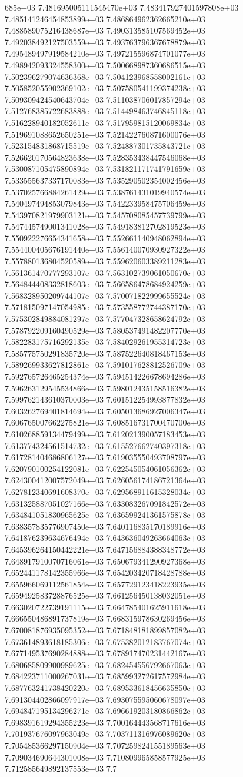 685e+03	7.481695005111545470e+03	7.483417927401597808e+03	7.485141246454853899e+03	7.486864962362665210e+03	7.488589075216438687e+03	7.490313585107569452e+03	7.492038492127503559e+03	7.493763796367678879e+03	7.495489497919584210e+03	7.497215596874701077e+03	7.498942093324558300e+03	7.500668987360686515e+03	7.502396279074636368e+03	7.504123968558002161e+03	7.505852055902369102e+03	7.507580541199374238e+03	7.509309424540643704e+03	7.511038706017857294e+03	7.512768385722683888e+03	7.514498463746845118e+03	7.516228940182052611e+03	7.517959815120069834e+03	7.519691088652650251e+03	7.521422760871600076e+03	7.523154831868715519e+03	7.524887301735843721e+03	7.526620170564823638e+03	7.528353438447546068e+03	7.530087105475890894e+03	7.531821171741791659e+03	7.533555637337170083e+03	7.535290502354002456e+03	7.537025766884261429e+03	7.538761431019940574e+03	7.540497494853079843e+03	7.542233958475706459e+03	7.543970821979903121e+03	7.545708085457739799e+03	7.547445749001341028e+03	7.549183812702819523e+03	7.550922276654341658e+03	7.552661140948062894e+03	7.554400405676191440e+03	7.556140070930927322e+03	7.557880136804520589e+03	7.559620603389211283e+03	7.561361470777293107e+03	7.563102739061050670e+03	7.564844408332818603e+03	7.566586478684924259e+03	7.568328950209744107e+03	7.570071822999655524e+03	7.571815097147054985e+03	7.573558772744387170e+03	7.575302849884081297e+03	7.577047328658624792e+03	7.578792209160490529e+03	7.580537491482207770e+03	7.582283175716292135e+03	7.584029261955314723e+03	7.585775750291835720e+03	7.587522640818467153e+03	7.589269933627812861e+03	7.591017628812526709e+03	7.592765726465254374e+03	7.594514226678694286e+03	7.596263129545534866e+03	7.598012435158516382e+03	7.599762143610370003e+03	7.601512254993877832e+03	7.603262769401814694e+03	7.605013686927006347e+03	7.606765007662275821e+03	7.608516731700470700e+03	7.610268859134479499e+03	7.612021390057183453e+03	7.613774324561514732e+03	7.615527662740397318e+03	7.617281404686806127e+03	7.619035550493708797e+03	7.620790100254122081e+03	7.622545054061056362e+03	7.624300412007572049e+03	7.626056174186721364e+03	7.627812340691608370e+03	7.629568911615328034e+03	7.631325887051027166e+03	7.633083267091842572e+03	7.634841051830965625e+03	7.636599241361575878e+03	7.638357835776907450e+03	7.640116835170189916e+03	7.641876239634676494e+03	7.643636049263664063e+03	7.645396264150442221e+03	7.647156884388348772e+03	7.648917910070716061e+03	7.650679341290927368e+03	7.652441178142355966e+03	7.654203420718428788e+03	7.655966069112561854e+03	7.657729123418223935e+03	7.659492583728876525e+03	7.661256450138032051e+03	7.663020722739191115e+03	7.664785401625911618e+03	7.666550486891737819e+03	7.668315978630269456e+03	7.670081876935095352e+03	7.671848181899857082e+03	7.673614893618185306e+03	7.675382012183767074e+03	7.677149537690284888e+03	7.678917470231442167e+03	7.680685809900989625e+03	7.682454556792667063e+03	7.684223711000267031e+03	7.685993272617572984e+03	7.687763241738420220e+03	7.689533618456635850e+03	7.691304402866097917e+03	7.693075595060678097e+03	7.694847195134296271e+03	7.696619203180866862e+03	7.698391619294355223e+03	7.700164443568717616e+03	7.701937676097963049e+03	7.703711316976089620e+03	7.705485366297150904e+03	7.707259824155189563e+03	7.709034690644301008e+03	7.710809965858577925e+03	7.712585649892137553e+03	7.7